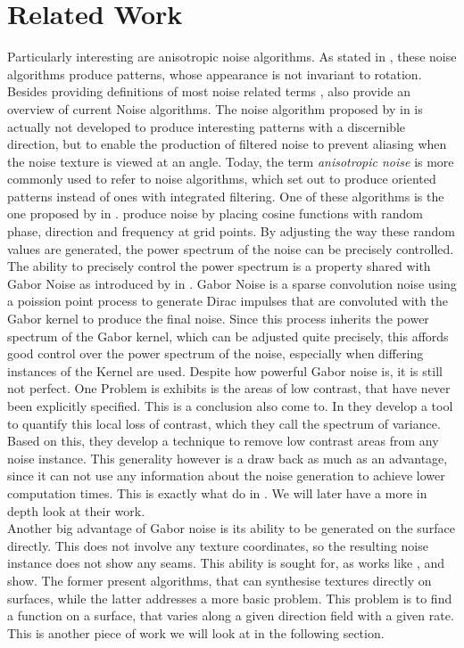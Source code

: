 \documentclass{utue} %
\begin{document}
\section{Related Work}
Particularly interesting are anisotropic noise algorithms. As stated in \cite{survey}, these noise algorithms produce patterns, whose appearance is not invariant to rotation. Besides providing definitions of most noise related terms \citeauthor{survey}, also provide an overview of current Noise algorithms. The noise algorithm proposed by \citeauthor{anisotropicNoise} in \cite{anisotropicNoise} is actually not developed to produce interesting patterns with a discernible direction, but to enable the production of filtered noise to prevent aliasing when the noise texture is viewed at an angle. Today, the term \textit{anisotropic noise} is more commonly used to refer to noise algorithms, which set out to produce oriented patterns instead of ones with integrated filtering. One of these algorithms is the one proposed by \citeauthor{randomPhaseNoise} in \cite{randomPhaseNoise}. \citeauthor{randomPhaseNoise} produce noise by placing cosine functions with random phase, direction and frequency at grid points. By adjusting the way these random values are generated, the power spectrum of the noise can be precisely controlled. The ability to precisely control the power spectrum is a property shared with Gabor Noise as introduced by \citeauthor{gaborNoise} in \cite{gaborNoise}. Gabor Noise is a sparse convolution noise using a poission point process to generate Dirac impulses that are convoluted with the Gabor kernel to produce the final noise. Since this process inherits the power spectrum of the Gabor kernel, which can be adjusted quite precisely, this affords good control over the power spectrum of the noise, especially when differing instances of the Kernel are used. Despite how powerful Gabor noise is, it is still not perfect. One Problem is exhibits is the areas of low contrast, that have never been explicitly specified. This is a conclusion \citeauthor{spectrumOfVariance} also come to. In \cite{spectrumOfVariance} they develop a tool to quantify this local loss of contrast, which they call the spectrum of variance. Based on this, they develop a technique to remove low contrast areas from any noise instance. This generality however is a draw back as much as an advantage, since it can not use any information about the noise generation to achieve lower computation times. This is exactly what \citeauthor{phasorNoise} do in \cite{phasorNoise}. We will later have a more in depth look at their work.\\
Another big advantage of Gabor noise is its ability to be generated on the surface directly. This does not involve any texture coordinates, so the resulting noise instance does not show any seams. This ability is sought for, as works like \cite{appearanceTextureSynthesis}, \cite{textureSynthesis} and \cite{stripes} show. The former present algorithms, that can synthesise textures directly on surfaces, while the latter addresses a more basic problem. This problem is to find a function on a surface, that varies along a given direction field with a given rate. This is another piece of work we will look at in the following section.
\end{document}
